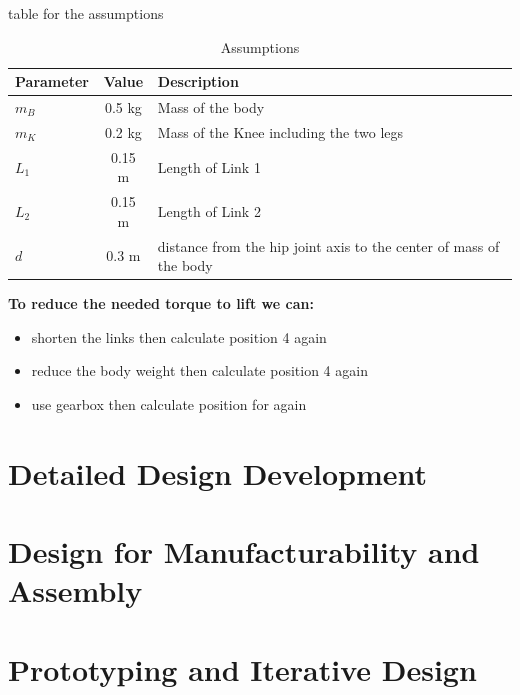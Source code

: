 table for the assumptions
\begin{table}[h]
	\centering
	\caption{Assumptions}
	\label{tab:assumptions}
	\begin{tabular}{lcl}
		\toprule
		Parameter & Value & Description 			  \\
		\midrule
		$m_B$         & 0.5 kg  & Mass of the body  \\
		$m_K$         & 0.2 kg  & Mass of the Knee including the two legs\\
		$L_1$         & 0.15 m   & Length of Link 1  \\
		$L_2$         & 0.15 m   & Length of Link 2   \\
		$d$ 	  	  & 0.3 m   & distance from the hip joint axis to the center of mass of the body   \\
		\bottomrule
	\end{tabular}
\end{table}

\begin{notebox}
	\textbf{To reduce the needed torque to lift we can:}
	\begin{itemize}
		\item shorten the links then calculate position 4 again
		\item reduce the body weight then calculate position 4 again
		\item use gearbox then calculate position for again
	\end{itemize}
\end{notebox}
\section{Detailed Design Development}
\section{Design for Manufacturability and Assembly}
\section{Prototyping and Iterative Design}


